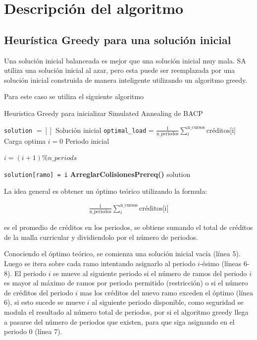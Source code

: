 \documentclass[letterpaper,10pt]{article}
\begin{document}
\section{Descripción del algoritmo}

\subsection{Heurística Greedy para una solución inicial}

Una solución inicial balanceada es mejor que una solución inicial muy mala. SA utiliza una solución inicial al azar, pero esta puede ser reemplazada por una solución inicial construida de manera inteligente utilizando un algoritmo greedy.

Para este caso se utiliza el siguiente algoritmo

\begin{algorithm}[H]
\caption{Heuristica Greedy para inicializar Simulated Annealing de BACP}
\label{GreedyHeuristic}
\begin{algorithmic}[1]
 {}
    \State \texttt{solution} $=[]$ Solución inicial
    \State \texttt{optimal\_load} = $\frac{1}{\text{n\_periodos}}\sum_{i}^{\text{n\_cursos}} \text{créditos[i]}$ \quad Carga optima
    \State $i = 0$ Periodo inicial

        \State $i = (i + 1) \% n\_periods $
      \EndIf

      \State \texttt{solution[ramo] = i}
      \State \textbf{ArreglarColisionesPrereq()}
    \EndFor
    \State \Return solution
\EndProcedure
\end{algorithmic}
\end{algorithm}

La idea general es obtener un óptimo teórico utilizando la formula:

\begin{align*}
  \frac{1}{\text{n\_periodos}}\sum_{i}^{\text{n\_cursos}} \text{créditos[i]}
\end{align*}

es el promedio de créditos en los periodos, se obtiene sumando el total de créditos de la malla curricular y dividiendolo por el número de periodos.

Conociendo el óptimo teórico, se comienza una solución inicial vacía (línea 5). Luego se itera sobre cada ramo intentando asignarlo al periodo $i$-ésimo (líneas 6-8). El periodo $i$ se mueve al siguiente periodo si el número de ramos del periodo $i$ es mayor al máximo de ramos por periodo permitido (restricción) o si el número de créditos del periodo $i$ mas los créditos del nuevo ramo exceden el óptimo (línea 6), si esto sucede se mueve $i$ al siguiente periodo disponible, como seguridad se modula el resultado al número total de periodos, por si el algoritmo greedy llega a pasarse del número de periodos que existen, para que siga asignando en el periodo 0 (línea 7).
\end{document}

